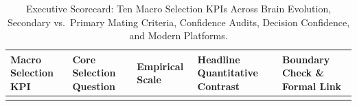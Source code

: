 \begin{table}[!t]
\caption{Executive Scorecard: Ten Macro Selection KPIs Across Brain Evolution, Secondary vs.\ Primary Mating Criteria, Confidence Audits, Decision Confidence, and Modern Platforms.}\label{tab:macro_kpis}
\scriptsize
\renewcommand{\arraystretch}{0.96}
\setlength{\tabcolsep}{3.5pt}
\begin{tabularx}{\textwidth}{@{}>{\raggedright\arraybackslash}p{}>{\raggedright\arraybackslash}p{}>{\raggedright\arraybackslash}p{}LL@{}}
\toprule
Macro Selection KPI & Core Selection Question & Empirical Scale & Headline Quantitative Contrast & Boundary Check \& Formal Link \\
\midrule
{}
\bottomrule
\end{tabularx}
\end{table}

